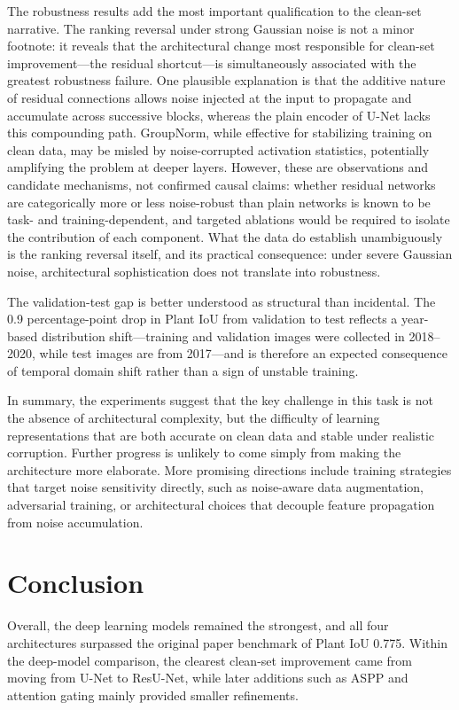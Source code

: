 \documentclass[conference]{IEEEtran}
\begin{document}
The robustness results add the most important qualification to the
clean-set narrative. The ranking reversal under strong Gaussian noise is
not a minor footnote: it reveals that the architectural change most
responsible for clean-set improvement---the residual shortcut---is
simultaneously associated with the greatest robustness failure. One
plausible explanation is that the additive nature of residual
connections allows noise injected at the input to propagate and
accumulate across successive blocks, whereas the plain encoder of U-Net
lacks this compounding path. GroupNorm, while effective for stabilizing
training on clean data, may be misled by noise-corrupted activation
statistics, potentially amplifying the problem at deeper layers. However,
these are observations and candidate mechanisms, not confirmed causal
claims: whether residual networks are categorically more or less
noise-robust than plain networks is known to be task- and
training-dependent, and targeted ablations would be required to isolate
the contribution of each component. What the data do establish
unambiguously is the ranking reversal itself, and its practical
consequence: under severe Gaussian noise, architectural sophistication
does not translate into robustness.

The validation-test gap is better understood as structural than
incidental. The 0.9 percentage-point drop in Plant IoU from validation
to test reflects a year-based distribution shift---training and
validation images were collected in 2018--2020, while test images are
from 2017---and is therefore an expected consequence of temporal domain
shift rather than a sign of unstable training.

In summary, the experiments suggest that the key challenge in this task
is not the absence of architectural complexity, but the difficulty of
learning representations that are both accurate on clean data and stable
under realistic corruption. Further progress is unlikely to come simply
from making the architecture more elaborate. More promising directions
include training strategies that target noise sensitivity directly, such
as noise-aware data augmentation, adversarial training, or architectural
choices that decouple feature propagation from noise accumulation.

\section{Conclusion}

Overall, the deep learning models remained the strongest, and all four
architectures surpassed the original paper benchmark of Plant IoU 0.775.
Within the deep-model comparison, the clearest clean-set improvement
came from moving from U-Net to ResU-Net, while later additions such as
ASPP and attention gating mainly provided smaller refinements.
\end{document}
